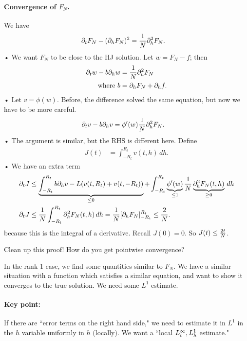 \paragraph{Convergence of $F_N$.}
We have
\begin{align*}
\partial_t F_N - (\partial_h F_N)^2 &= \frac{1}{N} \partial_h^2 F_N.
\end{align*}•
We want $F_N$ to be close to the HJ solution. Let $w=F_N-f$; then
\begin{align*}
\partial_t w - b \partial_h w &= \frac{1}{N} \partial_h^2 F_N\\
\text{where } b&= \partial_h F_N + \partial_h f.
\end{align*}•
Let $v=\phi(w)$. 
Before, the difference solved the same equation, but now we have to be more careful. 
\begin{align*}
\partial_t v - b \partial_h v &= \phi'(w) \frac{1}{N}\partial_h^2F_N.
\end{align*}•
The argument is similar, but the RHS is different here. Define
\begin{align*}
J(t) &=\int_{-R_t}^{R_t} v(t,h)\,dh.
\end{align*}•
We have an extra term
\begin{align*}
\partial_t J &\le \underbrace{\int_{-R_t}^{R_t} b\partial_h v -L(v(t,R_t)+v(t,-R_t))}_{\le 0}+ \int_{-R_t}^{R_t}\underbrace{\phi'(w)}_{\le 1} \frac{1}{N} \underbrace{\partial_h^2 F_N(t,h)}_{\ge0}\,dh \\
\partial_t J &\le \frac{1}{N} \int_{-R_t}^{R_t} \partial_h^2 F_N(t,h) \,dh
=\frac{1}{N} [\partial_h F_N]_{-R_t}^{R_t} \le \frac{2}{N}.
\end{align*}
because this is the integral of a derivative.
Recall $J(0)=0$. So $J(t)\le \frac{2t}{N}$.
\begin{exr}
Clean up this proof! How do you get pointwise convergence?
\end{exr}

In the rank-1 case, we find some quantities similar to $F_N$. We have a similar situation with a function which satisfies a similar equation, and want to show it converges to the true solution. We need some $L^1$ estimate.

\paragraph{Key point:}
If there are ``error terms on the right hand side," we need to estimate it in $L^1$ in the $h$ variable uniformly in $h$ (locally). 
We want a ``local $L_t^\infty,L_h^1$ estimate." 